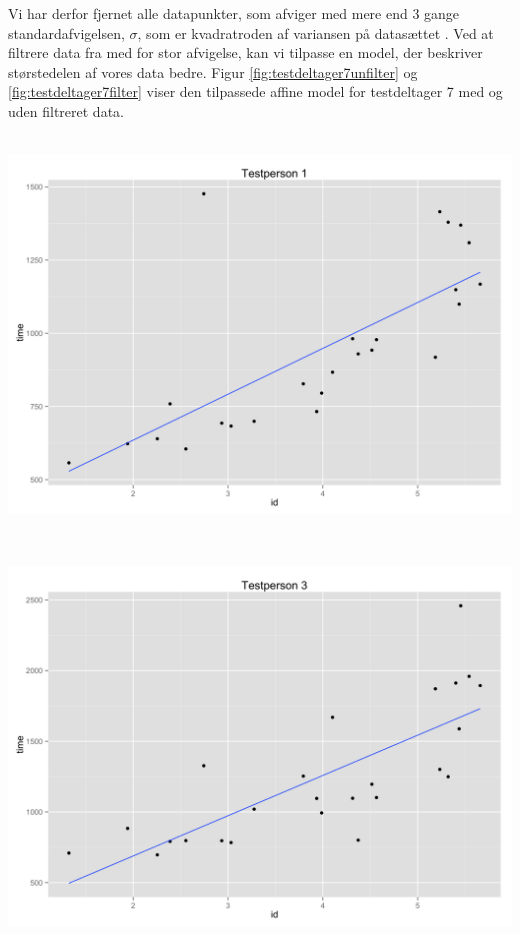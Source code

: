 Vi har derfor fjernet alle datapunkter, som afviger med mere end 3 gange standardafvigelsen, $\sigma$, som er kvadratroden af variansen på datasættet \cite{pearson1894}. Ved at filtrere data fra med for stor afvigelse, kan vi tilpasse en model, der beskriver størstedelen af vores data bedre. Figur \ref{fig:testdeltager7unfilter} og \ref{fig:testdeltager7filter} viser den tilpassede affine model for testdeltager 7 med og uden filtreret data.\\\\
\begin{minipage}{\linewidth}
	\begin{minipage}[b]{.45\linewidth}
		\includegraphics[width=\textwidth]{images/plots/plot_model_test_1}
		\label{fig:testdeltager1}
	\end{minipage}
	\begin{minipage}[b]{0.1\linewidth}
	~
	\end{minipage}
	\begin{minipage}[b]{0.45\linewidth}
		\includegraphics[width=\textwidth]{images/plots/plot_model_test_2}
		\label{fig:testdeltager3}
	\end{minipage}
\end{minipage}

